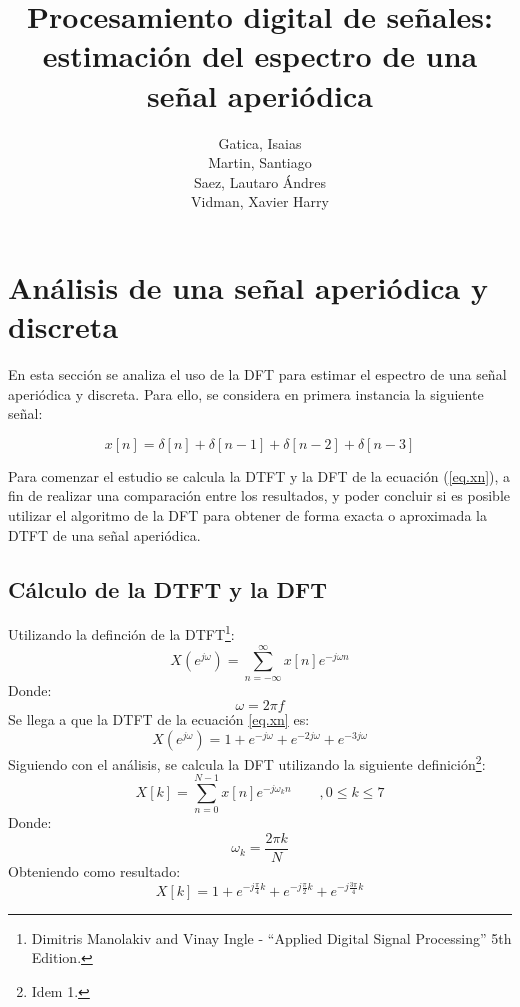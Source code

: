 \documentclass[11pt,a4paper]{article}
\author{Gatica, Isaias \\ Martin, Santiago \\ Saez, Lautaro Ándres \\ Vidman, Xavier Harry}
\title{Procesamiento digital de señales: estimación del espectro de una señal aperiódica}
\date{}
\begin{document}
\maketitle
\section{Análisis de una señal aperiódica y discreta}
En esta sección se analiza el uso de la DFT para estimar el espectro de una señal aperiódica y discreta. Para ello, se considera en primera instancia la siguiente señal:

\begin{equation}
    x[n]=\delta[n]+\delta[n-1]+\delta[n-2]+\delta[n-3]
    \label{eq.xn}
\end{equation}

Para comenzar el estudio se calcula la DTFT y la DFT de la ecuación (\ref{eq.xn}), a fin de realizar una comparación entre los resultados, y poder concluir si es posible utilizar el algoritmo de la DFT para obtener de forma exacta o aproximada la DTFT de una señal aperiódica.

    \subsection{Cálculo de la DTFT y la DFT}

    Utilizando la definción de la DTFT\footnote{Dimitris Manolakiv and Vinay Ingle - ``Applied Digital Signal Processing'' 5th Edition.}:
    \begin{equation}
        X(e^{j\omega})=\sum_{n=-\infty}^{\infty}x[n]e^{-j\omega n}
    \end{equation}
    Donde:
    \begin{equation}
        \label{omega}
        \omega=2\pi f
    \end{equation}
    Se llega a que la DTFT de la ecuación \ref{eq.xn} es:
    \begin{equation}
        X(e^{j\omega})=1+e^{-j\omega}+e^{-2j\omega}+e^{-3j\omega}
        \label{DTFT.R}
    \end{equation}
    Siguiendo con el análisis, se calcula la DFT utilizando la siguiente definición\footnote{Idem 1.}:
    \begin{equation}
        X[k]=\sum_{n=0}^{N-1}x[n]e^{-j\omega_k n} \qquad , 0 \leq k \leq 7
    \end{equation}
    Donde:
    \begin{equation}
        \label{omega.k}
        \omega_k=\frac{2\pi k}{N}
    \end{equation}
    Obteniendo como resultado:
    \begin{equation}
        \label{DFT.R}
        X[k]=1 + e^{-j \frac{\pi}{4} k} + e^{-j \frac{\pi}{2} k} + e^{-j \frac{3 \pi}{4} k}
    \end{equation}
    
\end{document}
